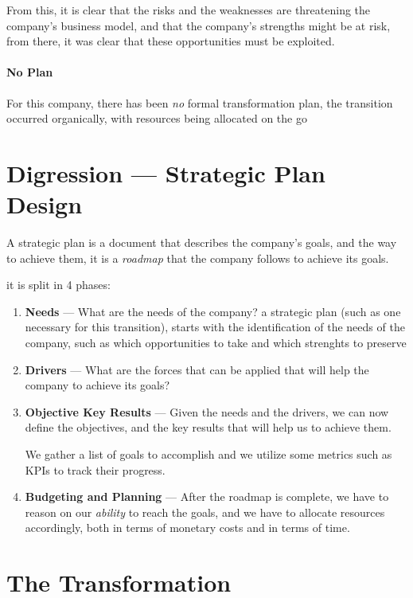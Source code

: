 \documentclass[openright, twoside, twocolumn, a4paper, 10pt]{report}
\begin{document}
From this, it is clear that the risks and the weaknesses are threatening the company's business model, and that the company's strengths might
be at risk, from there, it was clear that these opportunities must be exploited.

\paragraph{No Plan}

For this company, there has been \emph{no} formal transformation plan, the transition occurred organically, with resources being
allocated on the go

\section{Digression --- Strategic Plan Design}

A strategic plan is a document that describes the company's goals, and the way to achieve them, it is a \emph{roadmap} that
the company follows to achieve its goals.

it is split in 4 phases:

\begin{enumerate}
	\item \textbf{Needs} --- What are the needs of the company? a strategic plan (such as one necessary for this transition), starts with the identification of the needs of the company, such
	      as which opportunities to take and which strenghts to preserve
	\item \textbf{Drivers} --- What are the forces that can be applied that will help the company to achieve its goals?
	\item \textbf{Objective Key Results} --- Given the needs and the drivers, we can now define the objectives, and the key results that will help us to achieve them.

	      We gather a list of goals to accomplish and we utilize some metrics such as KPIs to track their progress.

	\item \textbf{Budgeting and Planning} --- After the roadmap is complete, we have to reason on our \emph{ability} to reach the goals, and we have to allocate resources accordingly,
	      both in terms of monetary costs and in terms of time.

\end{enumerate}

\section{The Transformation}
\end{document}

